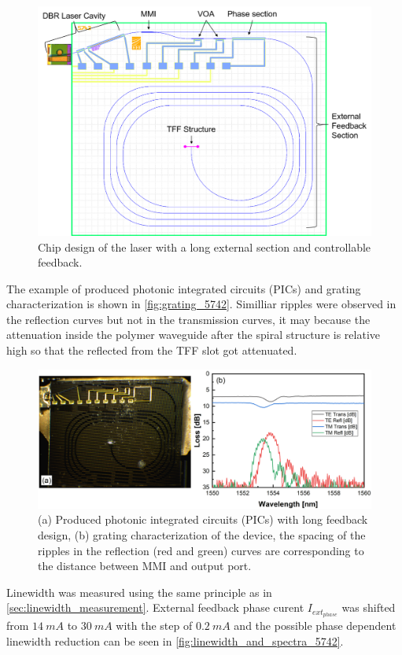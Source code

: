 \begin{figure}[H]
    \centering
    \includegraphics[width=0.8\linewidth]{figures/5742_spiral_comment.png}
    \caption{Chip design of the laser with a long external section and controllable feedback.}
    \label{fig:grating_5742}
\end{figure}

The example of produced photonic integrated circuits (PICs) and grating characterization is shown in \autoref{fig:grating_5742}. Similliar ripples were observed in the reflection curves but not in the transmission curves, it may because the attenuation inside the polymer waveguide after the spiral structure is relative high so that the reflected from the TFF slot got attenuated.

\begin{figure}[ht]
    \centering
    \includegraphics[width=\linewidth]{figures/grating_5742.png}
    \caption{(a) Produced photonic integrated circuits (PICs) with long feedback design, (b) grating characterization of the device, the spacing of the ripples in the reflection (red and green) curves are corresponding to the distance between MMI and output port.}
    \label{fig:grating_5742}
\end{figure}

Linewidth was measured using the same principle as in \autoref{sec:linewidth_measurement}. External feedback phase curent $I_{ext_{phase}}$ was shifted from $14 \ mA$ to $30 \ mA$ with the step of $0.2 \ mA$ and the possible phase dependent linewidth reduction can be seen in \autoref{fig:linewidth_and_spectra_5742}. 

